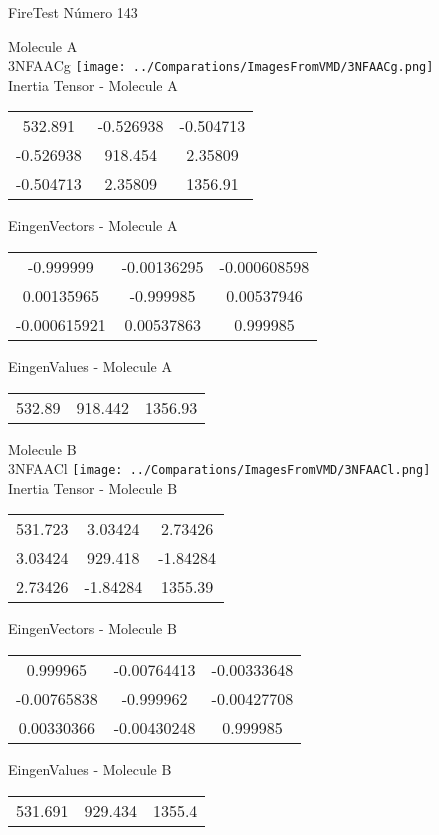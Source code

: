 \vtab[-2cm]
\begin{center}
{\large FireTest \tab Número 143}
\end{center}
\begin{multicols}{2}
\begin{center}

Molecule A \\ 
3NFAACg
\texttt{[image: ../Comparations/ImagesFromVMD/3NFAACg.png]}
\\
Inertia Tensor - Molecule A \\
\vtab

\begin{tabular}{|c c c|}
532.891	 & 	-0.526938	 & 	-0.504713	 \\
-0.526938	 & 	918.454	 & 	2.35809	 \\
-0.504713	 & 	2.35809	 & 	1356.91
\end{tabular}

\vtab
 EingenVectors - Molecule A     \\
\vtab
\begin{tabular}{|c c c|}
-0.999999	 & 	-0.00136295	 & 	-0.000608598	 \\
0.00135965	 & 	-0.999985	 & 	0.00537946	 \\
-0.000615921	 & 	0.00537863	 & 	0.999985
\end{tabular}

\vtab
 EingenValues - Molecule A     \\
\vtab
\begin{tabular}{|c c c|}
532.89	 & 	918.442	 & 	1356.93	 \\
\end{tabular}
\columnbreak

Molecule B \\ 
3NFAACl
\texttt{[image: ../Comparations/ImagesFromVMD/3NFAACl.png]}
\\
Inertia Tensor - Molecule B \\
\vtab

\begin{tabular}{|c c c|}
531.723	 & 	3.03424	 & 	2.73426	 \\
3.03424	 & 	929.418	 & 	-1.84284	 \\
2.73426	 & 	-1.84284	 & 	1355.39
\end{tabular}

\vtab
 EingenVectors - Molecule B     \\
\vtab
\begin{tabular}{|c c c|}
0.999965	 & 	-0.00764413	 & 	-0.00333648	 \\
-0.00765838	 & 	-0.999962	 & 	-0.00427708	 \\
0.00330366	 & 	-0.00430248	 & 	0.999985
\end{tabular}

\vtab
 EingenValues - Molecule B     \\
\vtab
\begin{tabular}{|c c c|}
531.691	 & 	929.434	 & 	1355.4	 \\
\end{tabular}

\end{center}
\end{multicols}
